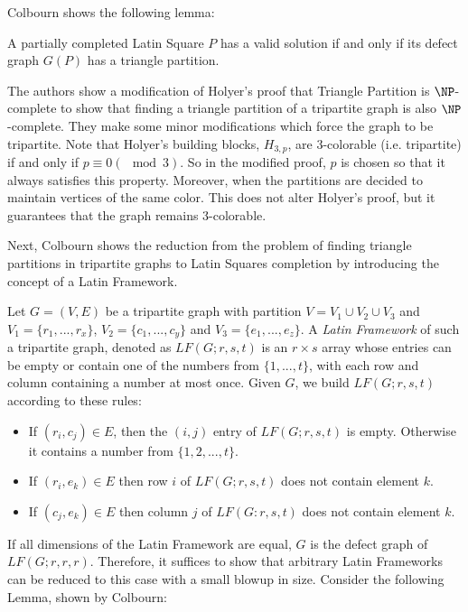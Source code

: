 \documentclass[runningheads,a4paper]{llncs}
\begin{document}
Colbourn \cite{colbourn1984complexity} shows the following lemma: 
\begin{lemma}\label{TP:lemma}
A partially completed Latin Square $P$ has a valid solution if and only if its defect graph $G(P)$ has a triangle partition. 
 \end{lemma}
 
The authors show a modification of Holyer's proof that Triangle Partition is $\NP$-complete to show that finding a triangle partition of a tripartite graph is also $\NP$-complete. They make some minor modifications which force the graph to be tripartite. Note that Holyer's building blocks, $H_{3,p}$, are 3-colorable (i.e. tripartite) if and only if $p \equiv 0 (\mod 3)$. So in the modified proof, $p$ is chosen so that it always satisfies this property. Moreover, when the partitions are decided to maintain vertices of the same color. This does not alter Holyer's proof, but it guarantees that the graph remains 3-colorable. 

Next, Colbourn shows the reduction from the problem of finding triangle partitions in tripartite graphs to Latin Squares completion by introducing the concept of a Latin Framework. 

\begin{definition} 
Let $G = (V, E)$ be a tripartite graph with partition $V = V_1 \cup V_2 \cup V_3$ and $V_1 = \{r_1,...,r_x\}$, $V_2 = \{c_1,...,c_y\}$ and $V_3 = \{e_1,...,e_z\}$. A \emph{Latin Framework} of such a tripartite graph, denoted as $LF(G;r,s,t)$ is an $r \times s$ array whose entries can be empty or contain one of the numbers from $\{1, ... ,t \}$, with each row and column containing a number at most once. Given $G$, we build $LF(G;r,s,t)$ according to these rules: 

\begin{itemize}
	\item If $(r_i, c_j) \in E$, then the $(i,j)$ entry of $LF(G;r,s,t)$ is empty. Otherwise it contains a number from $\{1,2,...,t\}$. 
	\item If $(r_i, e_k) \in E$ then row $i$ of $LF(G;r,s,t)$ does not contain element $k$. 
	\item If $(c_j, e_k) \in E$ then column $j$ of $LF(G:r,s,t)$ does not contain element $k$. 
\end{itemize}
\end{definition}

If all dimensions of the Latin Framework are equal, $G$ is the defect graph of $LF(G;r ,r, r)$. Therefore, it suffices to show that arbitrary Latin Frameworks can be reduced to this case with a small blowup in size. Consider the following Lemma, shown by Colbourn: 
\end{document}
